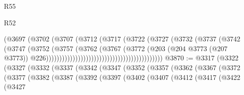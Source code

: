\begin{lexlean}{R55}
\begin{lexlean}{R52}
\begin{coremodule}
{{{{{{{{{{{{{{{{{{{{{{{{{{{{{{{{{{{{{{{{{{{{{{{{{{{{{{{{{{{{{{{{{{{{{{{{{{{{{{{{{{{{{{{{{{{{{{{{{{{{{{{{{{{{{{{{{{{{{{{{{{{{{{{{{{{{{{{{{{{{{{{{{{{{{{{{{{{{{{{{{{{{{{{{{{{{{{{{{{{{{{{{{{{{{{{{{{{{{{                                                          (@3697
                                                            (@3702
                                                              (@3707
                                                                (@3712
                                                                  (@3717
                                                                    (@3722
                                                                      (@3727
                                                                        (@3732
                                                                          (@3737
                                                                            (@3742
                                                                              (@3747
                                                                                (@3752
                                                                                  (@3757
                                                                                    (@3762
                                                                                      (@3767
                                                                                        (@3772
                                                                                          (@203
                                                                                            (@204
                                                                                              @3773
                                                                                              (@207
                                                                                                @3773))
                                                                                            @226))))))))))))))))))))))))))))))))))))))))))))
@3870 := @3317
    (@3322
      (@3327
        (@3332
          (@3337
            (@3342
              (@3347
                (@3352
                  (@3357
                    (@3362
                      (@3367
                        (@3372
                          (@3377
                            (@3382
                              (@3387
                                (@3392
                                  (@3397
                                    (@3402
                                      (@3407
                                        (@3412
                                          (@3417
                                            (@3422
                                              (@3427
}}}}}}}}}}}}}}}}}}}}}}}}}}}}}}}}}}}}}}}}}}}}}}}}}}}}}}}}}}}}}}}}}}}}}}}}}}}}}}}}}}}}}}}}}}}}}}}}}}}}}}}}}}}}}}}}}}}}}}}}}}}}}}}}}}}}}}}}}}}}}}}}}}}}}}}}}}}}}}}}}}}}}}}}}}}}}}}}}}}}}}}}}}}}}}}}}}}}}}
\end{coremodule}
\end{lexlean}
\end{lexlean}
